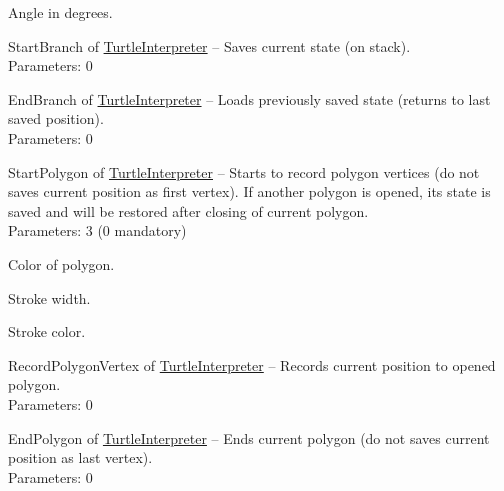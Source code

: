 \begin{description*}
\begin{enumerate*}
Angle in degrees.			\end{enumerate*}
		\item[StartBranch] of \hyperref[Malsys.Processing.Components.Interpreters.TurtleInterpreter]{TurtleInterpreter}
			-- Saves current state (on stack).
		\\ Parameters: 0 
		\item[EndBranch] of \hyperref[Malsys.Processing.Components.Interpreters.TurtleInterpreter]{TurtleInterpreter}
			-- Loads previously saved state (returns to last saved position).
		\\ Parameters: 0 
		\item[StartPolygon] of \hyperref[Malsys.Processing.Components.Interpreters.TurtleInterpreter]{TurtleInterpreter}
			-- Starts to record polygon vertices (do not saves current position as first vertex).
            If another polygon is opened, its state is saved and will be restored after closing of current polygon.
		\\ Parameters: 3  (0 mandatory) 
			\begin{enumerate*}
				\item
Color of polygon.				\item
            Stroke width.				\item
            Stroke color.			\end{enumerate*}
		\item[RecordPolygonVertex] of \hyperref[Malsys.Processing.Components.Interpreters.TurtleInterpreter]{TurtleInterpreter}
			-- Records current position to opened polygon.
		\\ Parameters: 0 
		\item[EndPolygon] of \hyperref[Malsys.Processing.Components.Interpreters.TurtleInterpreter]{TurtleInterpreter}
			-- Ends current polygon (do not saves current position as last vertex).
		\\ Parameters: 0 
	\end{description*}
